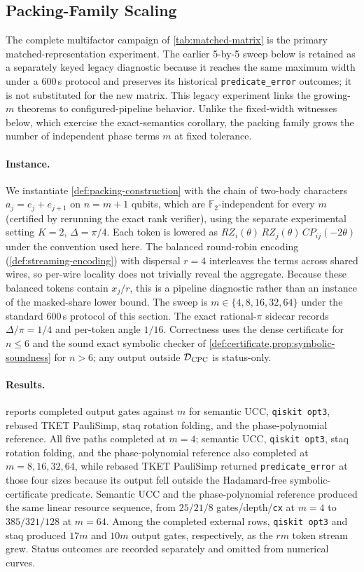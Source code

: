 \documentclass[aps,prx,reprint,floatfix,superscriptaddress]{revtex4-2}
\newcommand{\Ftwo}{\mathbb{F}_2}
\newcommand{\pkResultsSummary}{All five paths completed at $m=4$; semantic
UCC, \texttt{qiskit opt3}, staq rotation folding, and the phase-polynomial
reference also completed at $m=8,16,32,64$, while rebased TKET PauliSimp
returned \texttt{predicate\_error} at those four sizes because its output
fell outside the Hadamard-free symbolic-certificate predicate. Semantic UCC
and the phase-polynomial reference produced the same linear resource sequence,
from $25/21/8$ gates/depth/\texttt{cx} at $m=4$ to $385/321/128$ at $m=64$.
Among the completed external rows, \texttt{qiskit opt3} and staq produced
$17m$ and $10m$ output gates, respectively, as the $r m$ token stream grew.
Status outcomes are recorded separately and omitted from numerical curves.}
\begin{document}
\subsection{Packing-Family Scaling}
\label{sec:packing-scaling}

The complete multifactor campaign of \cref{tab:matched-matrix}
is the primary matched-representation experiment.  The earlier 5-by-5 sweep
below is retained as a separately keyed legacy diagnostic because it reaches
the same maximum width under a 600\,s protocol and preserves its historical
\texttt{predicate\_error} outcomes; it is not substituted for the new matrix.
This legacy experiment links the growing-$m$ theorems to configured-pipeline
behavior. Unlike the fixed-width witnesses below, which exercise the
exact-semantics corollary, the packing family grows the number of
independent phase terms $m$ at fixed tolerance.

\paragraph{Instance.}
We instantiate \cref{def:packing-construction} with the chain of two-body
characters $a_j = e_j + e_{j+1}$ on $n = m+1$ qubits, which are
$\Ftwo$-independent for every $m$ (certified by rerunning the exact rank
verifier), using the separate experimental setting $K=2$, $\Delta=\pi/4$.
Each token is lowered as
$RZ_i(\theta)\,RZ_j(\theta)\,CP_{ij}(-2\theta)$ under the convention
used here. The balanced round-robin encoding
(\cref{def:streaming-encoding}) with dispersal $r = 4$ interleaves the
terms across shared wires, so per-wire locality does not trivially reveal
the aggregate.  Because these balanced tokens contain $x_j/r$, this is a
pipeline diagnostic rather than an instance of the masked-share lower
bound. The sweep is $m \in \{4, 8, 16, 32, 64\}$ under the
standard 600\,s protocol of this section.  The exact rational-$\pi$ sidecar
records $\Delta/\pi=1/4$ and per-token angle $1/16$.  Correctness uses the
dense certificate for $n\leq6$ and the sound exact symbolic checker of
\cref{def:certificate,prop:symbolic-soundness} for $n>6$; any output outside
$\mathcal D_{\rm CPC}$ is status-only.

\paragraph{Results.}
 reports completed output gates against $m$
for semantic UCC, \texttt{qiskit opt3}, rebased TKET PauliSimp, staq
rotation folding, and the phase-polynomial reference.
\pkResultsSummary
\end{document}
